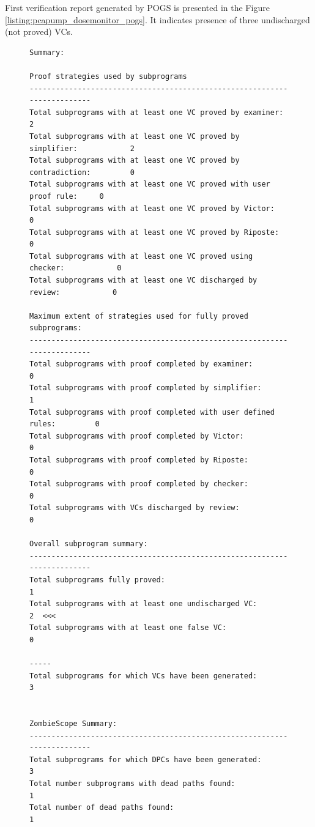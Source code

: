 First verification report generated by POGS is presented in the Figure \ref{listing:pcapump_dosemonitor_pogs}. It indicates presence of three undischarged (not proved) VCs.

\begin{figure}
\singlespacing
\begin{lstlisting}[frame=single, gobble=0]
Summary:

Proof strategies used by subprograms
-------------------------------------------------------------------------
Total subprograms with at least one VC proved by examiner:              2
Total subprograms with at least one VC proved by simplifier:            2
Total subprograms with at least one VC proved by contradiction:         0
Total subprograms with at least one VC proved with user proof rule:     0
Total subprograms with at least one VC proved by Victor:                0
Total subprograms with at least one VC proved by Riposte:               0
Total subprograms with at least one VC proved using checker:            0
Total subprograms with at least one VC discharged by review:            0

Maximum extent of strategies used for fully proved subprograms:
-------------------------------------------------------------------------
Total subprograms with proof completed by examiner:                     0
Total subprograms with proof completed by simplifier:                   1
Total subprograms with proof completed with user defined rules:         0
Total subprograms with proof completed by Victor:                       0
Total subprograms with proof completed by Riposte:                      0
Total subprograms with proof completed by checker:                      0
Total subprograms with VCs discharged by review:                        0

Overall subprogram summary:
-------------------------------------------------------------------------
Total subprograms fully proved:                                         1
Total subprograms with at least one undischarged VC:                    2  <<<
Total subprograms with at least one false VC:                           0
                                                                    -----
Total subprograms for which VCs have been generated:                    3


ZombieScope Summary:
-------------------------------------------------------------------------
Total subprograms for which DPCs have been generated:                   3
Total number subprograms with dead paths found:                         1
Total number of dead paths found:                                       1



\end{lstlisting}
\end{figure}
